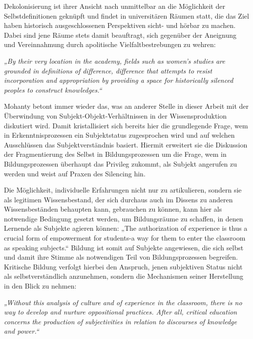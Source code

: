 Dekolonisierung ist ihrer Ansicht nach unmittelbar an die Möglichkeit der
Selbstdefinitionen geknüpft und findet in universitären Räumen statt, die das
Ziel haben historisch ausgeschlossenen Perspektiven sicht- und hörbar zu
machen.\footnotemark{} Dabei sind jene Räume stets damit beauftragt, sich gegenüber der Aneignung und Vereinnahmung durch apolitische Vielfaltbestrebungen zu wehren:
\begin{myenv} 
  \textit{„By their very location in the academy, fields such
    as women's studies are grounded in definitions of difference, difference
    that attempts to resist incorporation and appropriation by providing a
    space for historically silenced peoples to construct
    knowledges.“\footnotemark{} } \end{myenv}

Mohanty betont immer wieder das, was an anderer Stelle in dieser Arbeit mit
der Überwindung von Subjekt-Objekt-Verhältnissen in der Wissensproduktion
diskutiert wird. Damit kristallisiert sich bereits hier die grundlegende
Frage, wem in Erkenntnisprozessen ein Subjektstatus zugesprochen wird und
auf welchen Ausschlüssen das Subjektverständnis basiert. Hiermit erweitert
sie die Diskussion der Fragmentierung des Selbst in Bildungsprozessen um
die Frage, wem in Bildungsprozessen überhaupt das Privileg zukommt, als
Subjekt angerufen zu werden und weist auf Praxen des Silencing hin.

Die Möglichkeit, individuelle Erfahrungen nicht nur zu artikulieren, sondern
sie als legitimen Wissensbestand, der sich durchaus auch im Dissens zu anderen
Wissensbeständen behaupten kann, gebrauchen zu können, kann hier als notwendige
Bedingung gesetzt werden, um Bildungsräume zu schaffen, in denen Lernende als
Subjekte agieren können: „The authorization of experience is thus a crucial
form of empowerment for students-a way for them to enter the classroom as
speaking subjects.“\footnotemark{} Bildung ist somit auf Subjekte angewiesen, die sich selbst
und damit ihre Stimme als notwendigen Teil von Bildungsprozessen begreifen.
Kritische Bildung verfolgt hierbei den Anspruch, jenen subjektiven Status nicht
als selbstverständlich anzunehmen, sondern die Mechanismen seiner Herstellung
in den Blick zu nehmen: 
\begin{myenv} 
  \textit{
„Without this analysis of culture and of experience in the classroom, there is no way to develop and nurture oppositional practices. After all, critical education concerns the production of subjectivities in relation to discourses of knowledge and power.“\footnotemark{} } \end{myenv}

